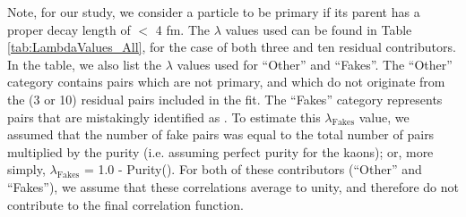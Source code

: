 \documentclass[../AnalysisNoteJBuxton.tex]{subfiles}
\begin{document}
Note, for our study, we consider a particle to be primary if its parent has a proper decay length of $<$ 4 fm.
The $\lambda$ values used can be found in Table \ref{tab:LambdaValues_All}, for the case of both three and ten residual contributors.  In the table, we also list the $\lambda$ values used for ``Other'' and ``Fakes''.  The ``Other'' category contains pairs which are not primary, and which do not originate from the (3 or 10) residual pairs included in the fit.  The ``Fakes'' category represents pairs that are mistakingly identified as \LamK.  To estimate this $\lambda_{\mathrm{Fakes}}$ value, we assumed that the number of fake pairs was equal to the total number of pairs multiplied by the \Lam purity (i.e. assuming perfect purity for the kaons); or, more simply, $\lambda_{\mathrm{Fakes}}$ = 1.0 - Purity(\Lam).  For both of these contributors (``Other'' and ``Fakes''), we assume that these correlations average to unity, and therefore do not contribute to the final correlation function.
\end{document}
